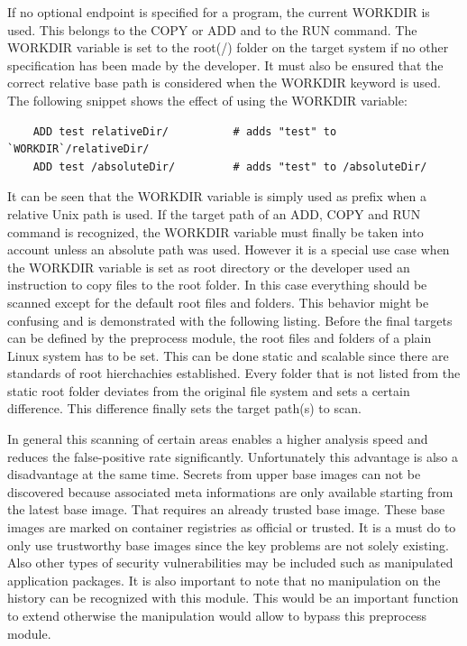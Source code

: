 If no optional endpoint is specified for a program, the current WORKDIR is used. This belongs to the COPY or ADD and to the RUN command.
The WORKDIR variable is set to the root(/) folder on the target system if no other specification has been made by the developer. 
It must also be ensured that the correct relative base path is considered when the WORKDIR keyword is used. 
The following snippet shows the effect of using the WORKDIR variable:
\begin{lstlisting}
	ADD test relativeDir/          # adds "test" to `WORKDIR`/relativeDir/
	ADD test /absoluteDir/         # adds "test" to /absoluteDir/
\end{lstlisting}
It can be seen that the WORKDIR variable is simply used as prefix when a relative Unix path is used.
If the target path of an ADD, COPY and RUN command is recognized, the WORKDIR variable must finally be taken into account unless an absolute path was used.
However it is a special use case when the WORKDIR variable is set as root directory or the developer used an instruction to copy files to the root folder. 
In this case everything should be scanned except for the default root files and folders.
This behavior might be confusing and is demonstrated with the following listing.
Before the final targets can be defined by the preprocess module, the root files and folders of a plain Linux system has to be set. 
This can be done static and scalable since there are standards of root hierchachies established.
Every folder that is not listed from the static root folder deviates from the original file system and sets a certain difference. 
This difference finally sets the target path(s) to scan. 

In general this scanning of certain areas enables a higher analysis speed and reduces the false-positive rate significantly.
Unfortunately this advantage is also a disadvantage at the same time. 
Secrets from upper base images can not be discovered because associated meta informations are only available starting from the latest base image.
That requires an already trusted base image.
These base images are marked on container registries as official or trusted. 
It is a must do to only use trustworthy base images since the key problems are not solely existing. 
Also other types of security vulnerabilities may be included such as manipulated application packages. 
It is also important to note that no manipulation on the history can be recognized with this module. 
This would be an important function to extend otherwise the manipulation would allow to bypass this preprocess module. 

